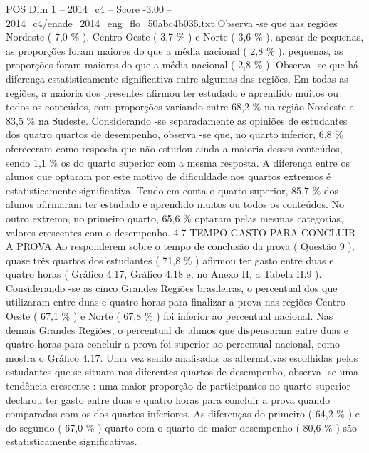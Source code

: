 \begin{textsample}{POS Dim 1 – 2014\_c4 – Score -3.00 – 2014\_c4/enade\_2014\_eng\_flo\_50abc4b035.txt}
Observa -se que nas regiões Nordeste ( 7,0 \% ), Centro-Oeste ( 3,7 \% ) e Norte ( 3,6 \% ), apesar de pequenas, as proporções foram maiores do que a média nacional ( 2,8 \% ). pequenas, as proporções foram maiores do que a média nacional ( 2,8 \% ).
Observa -se que há diferença estatisticamente significativa entre algumas das regiões.
Em todas as regiões, a maioria dos presentes afirmou ter estudado e aprendido muitos ou todos os conteúdos, com proporções variando entre 68,2 \% na região Nordeste e 83,5 \% na Sudeste.
Considerando -se separadamente as opiniões de estudantes dos quatro quartos de desempenho, observa -se que, no quarto inferior, 6,8 \% ofereceram como resposta que não estudou ainda a maioria desses conteúdos, sendo 1,1 \% os do quarto superior com a mesma resposta.
A diferença entre os alunos que optaram por este motivo de dificuldade nos quartos extremos é estatisticamente significativa.
Tendo em conta o quarto superior, 85,7 \% dos alunos afirmaram ter estudado e aprendido muitos ou todos os conteúdos.
No outro extremo, no primeiro quarto, 65,6 \% optaram pelas mesmas categorias, valores crescentes com o desempenho. 4.7 TEMPO GASTO PARA CONCLUIR A PROVA Ao responderem sobre o tempo de conclusão da prova ( Questão 9 ), quase três quartos dos estudantes ( 71,8 \% ) afirmou ter gasto entre duas e quatro horas ( Gráfico 4.17, Gráfico 4.18 e, no Anexo II, a Tabela II.9 ).
Considerando -se as cinco Grandes Regiões brasileiras, o percentual dos que utilizaram entre duas e quatro horas para finalizar a prova nas regiões Centro-Oeste ( 67,1 \% ) e Norte ( 67,8 \% ) foi inferior ao percentual nacional.
Nas demais Grandes Regiões, o percentual de alunos que dispensaram entre duas e quatro horas para concluir a prova foi superior ao percentual nacional, como mostra o Gráfico 4.17.
Uma vez sendo analisadas as alternativas escolhidas pelos estudantes que se situam nos diferentes quartos de desempenho, observa -se uma tendência crescente : uma maior proporção de participantes no quarto superior declarou ter gasto entre duas e quatro horas para concluir a prova quando comparadas com os dos quartos inferiores.
As diferenças do primeiro ( 64,2 \% ) e do segundo ( 67,0 \% ) quarto com o quarto de maior desempenho ( 80,6 \% ) são estatisticamente significativas.

\end{textsample}
